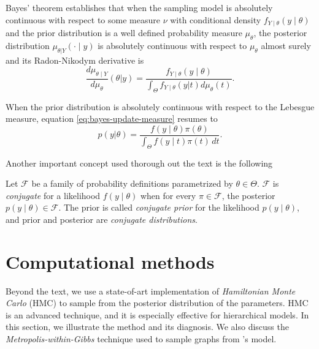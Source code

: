 Bayes' theorem establishes that when the sampling model is absolutely
continuous with respect to some measure $\nu$ with conditional density
$f_{Y\mid \theta}(y\mid\theta)$ and the prior distribution is a
well defined probability measure $\mu_{\theta}$, the posterior distribution
$\mu_{\theta|Y}(\cdot\mid y)$ is
absolutely continuous with respect to $\mu_{\theta}$ almost surely and its
Radon-Nikodym derivative is \cite[p. 16]{schervish2012theory}
\begin{equation}
  \label{eq:bayes-update-measure}
  \frac{d\mu_{\theta\mid Y}}{d\mu_{\theta}}(\theta|y) = \frac{f_{Y\mid \theta}(y\mid \theta)}{\int_{\Theta} f_{Y\mid\theta}(y|t)d\mu_{\theta}(t)}.  
\end{equation}

When the prior distribution is absolutely continuous with respect to the
Lebesgue measure, equation \eqref{eq:bayes-update-measure} resumes to 
\begin{equation}
  p(y|\theta) = \frac{f(y\mid \theta)\pi(\theta)}{\int_{\Theta} f(y\mid t)\pi(t) \, dt}.  
\end{equation}

Another important concept used thorough out the text is the following 

\begin{definition}
  \label{def:conjugate-family}
  Let $\mathcal{F}$ be a family of probability definitions parametrized by
  $\theta \in \Theta$. $\mathcal{F}$ is {\em conjugate} for a likelihood $f(y
  \mid \theta)$ when for every $\pi \in \mathcal{F}$, the posterior $p(y \mid
  \theta) \in \mathcal{F}$. The prior is called {\em conjugate prior} for the
  likelihood $p(y \mid \theta)$, and prior and posterior are {\em conjugate
  distributions}. 
\end{definition}

\section{Computational methods}
\label{sec:computational_methods}

Beyond the text, we use a state-of-art implementation of {\em Hamiltonian Monte
Carlo} (HMC) to sample from the posterior distribution of the parameters. HMC
is an advanced technique, and it is especially effective for hierarchical
models. In this section, we illustrate the method and its diagnosis. We also
discuss the {\em Metropolis-within-Gibbs} technique used to sample graphs from
\textcite{crawford2016}'s model.

